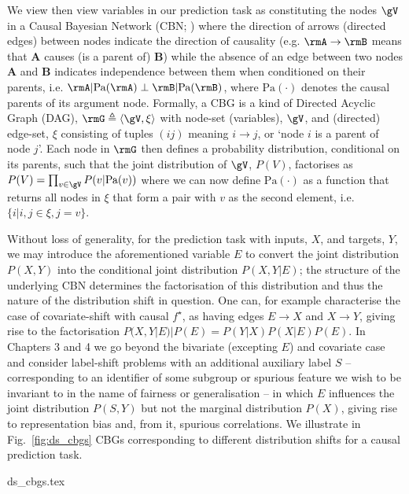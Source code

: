 We view then view variables in our prediction task as constituting the nodes \( \gV \) in a Causal
Bayesian Network (CBN; \cite{pearl1995bayesian}) where the direction of arrows (directed edges)
between nodes indicate the direction of causality (e.g. \(\rmA \to \rmB \) means that \textbf{A}
causes (is a parent of) \textbf{B}) while the absence of an edge between two nodes \textbf{A} and
\textbf{B} indicates independence between them when conditioned on their parents, i.e. \( \rmA |
\text{Pa}(\rmA) \perp \rmB | \text{Pa}(\rmB) \), where \( \text{Pa}(\cdot) \) denotes the causal
parents of its argument node.
%
Formally, a CBG is a kind of Directed Acyclic Graph (DAG), \(\rmG \triangleq \langle \gV, \xi
\rangle \) with node-set (variables), \(\gV\), and (directed) edge-set, \(\xi\) consisting of
tuples \((ij)\) meaning \(i \to j \), or `node \(i\) is a parent of node \(j\)'.
%
Each node in \( \rmG \) then defines a probability distribution, conditional on its parents, such that
the joint distribution of \(\gV\), \( P(V) \), factorises as \( P(V) = \prod_{v \in \gV} P(v |
\text{Pa}(v)) \) where we can now define \(\text{Pa}(\cdot)\) as a function that returns all nodes
in \(\xi\) that form a pair with \(v\) as the second element, i.e. \( \{ i | i,j \in \xi, j = v \}
\).
%

Without loss of generality, for the prediction task with inputs, \(X\), and targets, \(Y\), we may
introduce the aforementioned variable \(E\) to convert the joint distribution \(P(X, Y)\) into the
conditional joint distribution \( P(X, Y | E ) \); the structure of the underlying CBN determines
the factorisation of this distribution and thus the nature of the distribution shift in question.
%
One can, for example characterise the case of covariate-shift with causal \(f^\star\), as having
edges  \(E \to X\) and \( X \to Y \), giving rise to the factorisation \( P(X, Y | E) | P(E) =
P(Y|X)P(X|E)P(E) \). 
%
In Chapters 3 and 4 we go beyond the bivariate (excepting \( E \)) and covariate case and consider
label-shift problems with an additional auxiliary label \(S\) -- corresponding to an identifier of
some subgroup or spurious feature we wish to be invariant to in the name of fairness or
generalisation --  in which \(E\) influences the joint distribution \( P(S, Y) \) but not the
marginal distribution \(P(X)\), giving rise to representation bias and, from it, spurious
correlations.
%
We illustrate in Fig.~\ref{fig:ds_cbgs} CBGs corresponding to different distribution shifts for a
causal prediction task.
%

{ds_cbgs.tex}

